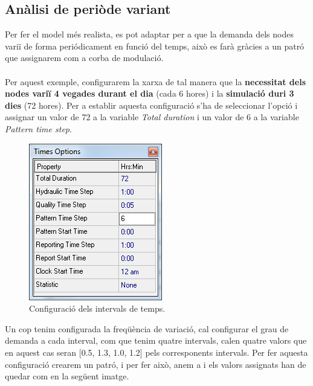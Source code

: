 \documentclass[12pt]{article}
\begin{document}
\subsection{Anàlisi de periòde variant}
Per fer el model més realista, es pot adaptar per a que la demanda dels nodes variï de forma periódicament en funció del temps, això es farà gràcies a un patró que assignarem com a corba de modulació. 
\\\\Per aquest exemple, configurarem la xarxa de tal manera que la \textbf{necessitat dels nodes variï 4 vegades durant el dia} (cada 6 hores) i la \textbf{simulació duri 3 dies} (72 hores). Per a establir aquesta configuració s'ha de seleccionar l'opció  i assignar un valor de 72 a la variable \textit{Total duration} i un valor de 6 a la variable \textit{Pattern time step}.
\begin{figure}[h!]
	\centering
	\includegraphics[scale=.7]{imatges/epanet/15.png}
	\caption{Configuració dels intervals de temps.}
\end{figure}
Un cop tenim configurada la freqüència de variació, cal configurar el grau de demanda a cada interval, com que tenim quatre intervals, calen quatre valors que en aquest cas seran [0.5, 1.3, 1.0, 1.2] pels corresponents intervals. Per fer aquesta configuració crearem un patró, i per fer això, anem a  i els valors assignats han de quedar com en la següent imatge.
\end{document}
